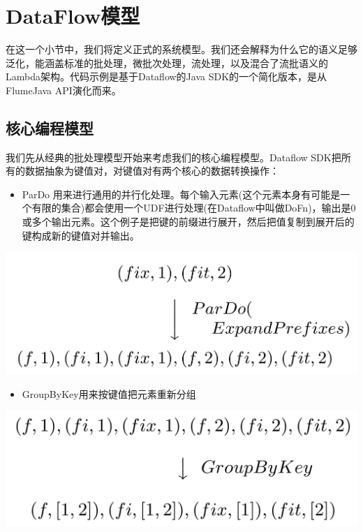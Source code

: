 \documentclass[oneside]{ctexbook}
\begin{document}
\section{DataFlow模型}

在这一个小节中，我们将定义正式的系统模型。我们还会解释为什么它的语义足够泛化，能涵盖标准的批处理，微批次处理，流处理，以及混合了流批语义的Lambda架构。代码示例是基于Dataflow的Java SDK的一个简化版本，是从FlumeJava API演化而来。

\subsection{核心编程模型}

我们先从经典的批处理模型开始来考虑我们的核心编程模型。Dataflow SDK把所有的数据抽象为键值对，对键值对有两个核心的数据转换操作：

\begin{itemize}
\item ParDo 用来进行通用的并行化处理。每个输入元素(这个元素本身有可能是一个有限的集合)都会使用一个UDF进行处理(在Dataflow中叫做DoFn)，输出是0或多个输出元素。这个例子是把键的前缀进行展开，然后把值复制到展开后的键构成新的键值对并输出。
\end{itemize}

\noindent \includegraphics[width=\textwidth]{pardo.png}

\begin{itemize}
\item GroupByKey用来按键值把元素重新分组
\end{itemize}

\noindent \includegraphics[width=\textwidth]{groupbykey.png}
\end{document}
